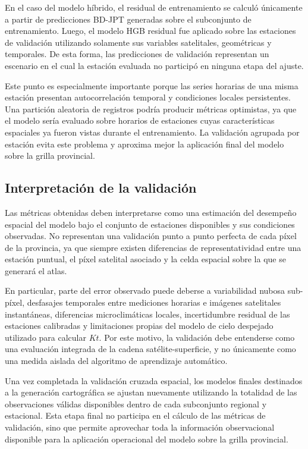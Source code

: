 \documentclass[../main.tex]{subfiles}
\begin{document}
En el caso del modelo híbrido, el residual de entrenamiento se calculó únicamente a partir de predicciones BD-JPT generadas sobre el subconjunto de entrenamiento. Luego, el modelo HGB residual fue aplicado sobre las estaciones de validación utilizando solamente sus variables satelitales, geométricas y temporales. De esta forma, las predicciones de validación representan un escenario en el cual la estación evaluada no participó en ninguna etapa del ajuste.

Este punto es especialmente importante porque las series horarias de una misma estación presentan autocorrelación temporal y condiciones locales persistentes. Una partición aleatoria de registros podría producir métricas optimistas, ya que el modelo sería evaluado sobre horarios de estaciones cuyas características espaciales ya fueron vistas durante el entrenamiento. La validación agrupada por estación evita este problema y aproxima mejor la aplicación final del modelo sobre la grilla provincial.

\subsection{Interpretación de la validación}

Las métricas obtenidas deben interpretarse como una estimación del desempeño espacial del modelo bajo el conjunto de estaciones disponibles y sus condiciones observadas. No representan una validación punto a punto perfecta de cada píxel de la provincia, ya que siempre existen diferencias de representatividad entre una estación puntual, el píxel satelital asociado y la celda espacial sobre la que se generará el atlas.

En particular, parte del error observado puede deberse a variabilidad nubosa sub-píxel, desfasajes temporales entre mediciones horarias e imágenes satelitales instantáneas, diferencias microclimáticas locales, incertidumbre residual de las estaciones calibradas y limitaciones propias del modelo de cielo despejado utilizado para calcular $Kt$. Por este motivo, la validación debe entenderse como una evaluación integrada de la cadena satélite-superficie, y no únicamente como una medida aislada del algoritmo de aprendizaje automático.

Una vez completada la validación cruzada espacial, los modelos finales destinados a la generación cartográfica se ajustan nuevamente utilizando la totalidad de las observaciones válidas disponibles dentro de cada subconjunto regional y estacional. Esta etapa final no participa en el cálculo de las métricas de validación, sino que permite aprovechar toda la información observacional disponible para la aplicación operacional del modelo sobre la grilla provincial.
\end{document}
